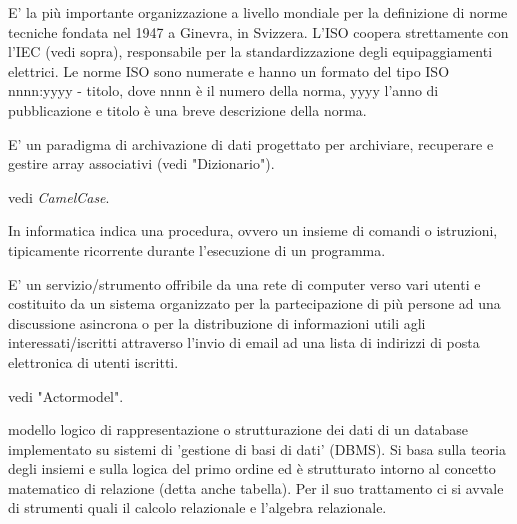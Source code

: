 \documentclass{scalatekids-article}
\begin{document}
   E' la più importante organizzazione a livello mondiale per la definizione di norme tecniche fondata nel 1947 a Ginevra, in Svizzera.
  L'ISO coopera strettamente con l'IEC (vedi sopra), responsabile per la standardizzazione degli equipaggiamenti elettrici.
  Le norme ISO sono numerate e hanno un formato del tipo ISO nnnn:yyyy - titolo, dove nnnn è il numero della norma, yyyy l'anno di pubblicazione e titolo è una breve descrizione della norma.




   E' un paradigma di archivazione di dati progettato per archiviare, recuperare e gestire array associativi (vedi "Dizionario").


   vedi \textit{CamelCase}.


   In informatica indica una procedura, ovvero un insieme di comandi o istruzioni, tipicamente ricorrente durante l'esecuzione di un programma.

   E' un servizio/strumento offribile da una rete di computer verso vari utenti e costituito da un sistema organizzato per la partecipazione di più persone ad una discussione asincrona o per la distribuzione di informazioni utili agli interessati/iscritti attraverso l'invio di email ad una lista di indirizzi di posta elettronica di utenti iscritti.

   vedi "Actormodel".

   modello logico di rappresentazione o strutturazione dei dati di un database implementato su sistemi di 'gestione di basi di dati' (DBMS).
  Si basa sulla teoria degli insiemi e sulla logica del primo ordine ed è strutturato intorno al concetto matematico di relazione (detta anche tabella). Per il suo trattamento ci si avvale di strumenti quali il calcolo relazionale e l'algebra relazionale.

\end{document}
